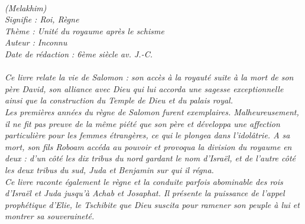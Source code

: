 \BFont
\noindent\hrulefill
{\footnotesize
\textit{
\bigskip
{\centering{}
\\(Melakhim)
\\Signifie : Roi, Règne
\\Thème : Unité du royaume après le schisme
\\Auteur : Inconnu
\\Date de rédaction : 6ème siècle av. J.-C.\\}
}
\textit{
\\Ce livre relate la vie de Salomon : son accès à la royauté suite à la mort de son père David, son alliance avec Dieu qui lui accorda une sagesse exceptionnelle ainsi que la construction du Temple de Dieu et du palais royal.
\\Les premières années du règne de Salomon furent exemplaires. Malheureusement, il ne fit pas preuve de la même piété que son père et développa une affection particulière pour les femmes étrangères, ce qui le plongea dans l’idolâtrie. A sa mort, son fils Roboam accéda au pouvoir et provoqua la division du royaume en deux : d’un côté les dix tribus du nord gardant le nom d’Israël, et de l’autre côté les deux tribus du sud, Juda et Benjamin sur qui il régna.
\\Ce livre raconte également le règne et la conduite parfois abominable des rois d’Israël et Juda jusqu’à Achab et Josaphat. Il présente la puissance de l’appel prophétique d’Elie, le Tschibite que Dieu suscita pour ramener son peuple à lui et montrer sa souveraineté.\bigskip
}
}
\par\nobreak\noindent\hrulefill
